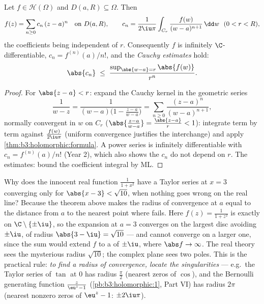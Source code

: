 \begin{theorem}[Holomorphic $=$ analytic]
\label{thm:b3:holomorphic:analytic}
Let $f \in \mathcal H(\Omega)$ and $D(a, R) \subseteq \Omega$.
Then
\[
f(z) = \sum_{n\geq0}c_n\,(z - a)^n \quad \text{on } D(a, R),
\qquad
c_n = \frac1{2\iu\pi}\int_{C_r}\frac{f(w)}{(w -
a)^{n+1}}\,\dd w \ \ (0 < r < R),
\]
the coefficients being independent of $r$. Consequently $f$ is
infinitely $\C$-differentiable, $c_n = f^{(n)}(a)/n!$, and the
\emph{Cauchy estimates} hold:
\[
\abs{c_n} \;\leq\; \frac{\sup_{\abs{w - a} =
r}\abs{f(w)}}{r^{n}} .
\]
\end{theorem}

\begin{proof}
For $\abs{z - a} < r$: expand the Cauchy kernel in the
geometric series
\[
\frac1{w - z} = \frac1{(w - a)\bigl(1 - \frac{z - a}{w -
a}\bigr)} = \sum_{n\geq0}\frac{(z - a)^n}{(w - a)^{n+1}},
\]
normally convergent in $w$ on $C_r$ ($\abs{\frac{z-a}{w-a}} =
\frac{\abs{z-a}}r < 1$): integrate term by term against
$\frac{f(w)}{2\iu\pi}$ (uniform convergence justifies the
interchange) and apply \cref{thm:b3:holomorphic:formula}. A
power series is infinitely differentiable with $c_n =
f^{(n)}(a)/n!$ (Year 2), which also shows the $c_n$ do not
depend on $r$. The estimates: bound the coefficient integral
by ML.
\end{proof}

\begin{example}
\label{ex:b3:holomorphic:radius}
Why does the innocent real function $\frac1{1 + x^2}$ have a
Taylor series at $x = 3$ converging only for $\abs{x - 3} <
\sqrt{10}$, when nothing goes wrong on the real line? Because
the theorem above makes the radius of convergence at $a$
equal to the distance from $a$ to the nearest point where
 fails. Here $f(z) = \frac1{1 + z^2}$ is
 exactly on $\C\setminus\{\pm\iu\}$, so the
expansion at $a = 3$ converges on the largest disc avoiding
$\pm\iu$, of radius $\abs{3 - \iu} = \sqrt{10}$ --- and
cannot converge on a larger one, since the sum would extend
$f$  to a  of $\pm\iu$, where
$\abs f \to \infty$. The real theory sees the mysterious
radius $\sqrt{10}$; the complex plane sees two poles.
This is the practical rule: \emph{to find a radius of
convergence, locate the singularities} --- e.g.\ the Taylor
series of $\tan$ at $0$ has radius $\frac\pi2$ (nearest
zeros of $\cos$), and the Bernoulli generating function
$\frac z{\eu^z - 1}$ (\cref{pb:b3:holomorphic:1}, Part VI)
has radius $2\pi$ (nearest nonzero zeros of $\eu^z - 1$:
$\pm2\iu\pi$).
\end{example}

